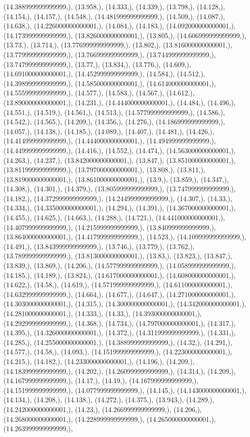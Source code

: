 \documentclass{article}
\begin{document}
(14.388999999999999,), (13.958,), (14.333,), (14.339,), (13.798,), (14.128,), (14.154,), (14.157,), (14.548,), (14.481999999999999,), (14.509,), (14.087,), (14.638,), (14.226000000000001,), (14.084,), (14.183,), (14.092000000000001,), (14.173999999999999,), (13.826000000000001,), (13.805,), (14.606999999999999,), (13.73,), (13.714,), (13.776999999999999,), (13.802,), (13.816000000000001,), (13.779999999999999,), (13.766999999999999,), (13.744999999999999,), (13.747999999999999,), (13.77,), (13.834,), (13.776,), (14.609,), (14.691000000000001,), (14.452999999999999,), (14.584,), (14.512,), (14.398999999999999,), (14.585000000000001,), (14.614000000000001,), (14.555999999999999,), (14.577,), (14.583,), (14.567,), (14.612,), (13.890000000000001,), (14.231,), (14.444000000000001,), (14.484,), (14.496,), (14.551,), (14.519,), (14.561,), (14.513,), (14.577999999999999,), (14.586,), (14.542,), (14.565,), (14.209,), (14.356,), (14.276,), (14.186999999999999,), (14.057,), (14.138,), (14.185,), (14.089,), (14.407,), (14.481,), (14.426,), (14.414999999999999,), (14.444000000000001,), (14.494999999999999,), (14.449999999999999,), (14.416,), (14.552,), (14.474,), (14.563000000000001,), (14.263,), (14.237,), (13.842000000000001,), (13.847,), (13.851000000000001,), (13.811999999999999,), (13.797000000000001,), (13.808,), (13.811,), (13.819000000000001,), (13.861000000000001,), (13.9,), (13.859,), (14.347,), (14.308,), (14.301,), (14.379,), (13.805999999999999,), (13.747999999999999,), (14.182,), (14.372999999999999,), (14.244999999999999,), (14.307,), (14.33,), (14.334,), (14.335000000000001,), (14.294,), (14.391,), (14.367000000000001,), (14.455,), (14.625,), (14.663,), (14.288,), (14.721,), (14.441000000000001,), (14.407999999999999,), (14.215999999999999,), (13.840999999999999,), (13.864000000000001,), (14.417999999999999,), (14.523,), (14.109999999999999,), (14.491,), (13.843999999999999,), (13.746,), (13.779,), (13.762,), (13.789999999999999,), (13.813000000000001,), (13.83,), (13.823,), (13.847,), (13.839,), (13.869,), (14.206,), (14.577999999999999,), (14.058999999999999,), (14.185,), (14.189,), (13.824,), (14.617000000000001,), (14.608000000000001,), (14.622,), (14.58,), (14.619,), (14.571999999999999,), (14.611000000000001,), (14.632999999999999,), (14.664,), (14.677,), (14.647,), (14.271000000000001,), (14.303000000000001,), (14.315,), (14.300000000000001,), (14.342000000000001,), (14.281000000000001,), (14.333,), (14.33,), (14.393000000000001,), (14.292999999999999,), (14.368,), (14.734,), (14.797000000000001,), (14.317,), (14.395,), (14.326000000000001,), (14.372,), (14.311999999999999,), (14.331,), (14.285,), (14.255000000000001,), (14.388999999999999,), (14.32,), (14.291,), (14.577,), (14.58,), (14.093,), (14.151999999999999,), (14.223000000000001,), (14.215,), (14.182,), (14.233000000000001,), (14.196,), (14.209,), (14.183999999999999,), (14.202,), (14.260999999999999,), (14.314,), (14.209,), (14.167999999999999,), (14.17,), (14.19,), (14.167999999999999,), (14.151999999999999,), (14.077999999999999,), (14.145,), (14.143000000000001,), (14.134,), (14.208,), (14.138,), (14.272,), (14.375,), (13.943,), (14.289,), (14.242000000000001,), (14.23,), (14.266999999999999,), (14.206,), (14.268000000000001,), (14.228999999999999,), (14.265000000000001,), (14.263999999999999,), 
\end{document}
